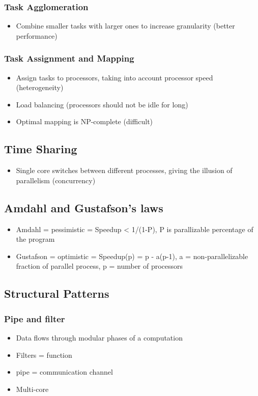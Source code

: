 \documentclass{assignments}
\begin{document}
\subsubsection*{Task Agglomeration}
\label{sec:org986ff91}
\begin{itemize}
\item Combine smaller tasks with larger ones to increase granularity (better performance)
\end{itemize}
\subsubsection*{Task Assignment and Mapping}
\label{sec:org9cd00b1}
\begin{itemize}
\item Assign tasks to processors, taking into account processor speed (heterogeneity)
\item Load balancing (processors should not be idle for long)
\item Optimal mapping is NP-complete (difficult)
\end{itemize}
\subsection*{Time Sharing}
\label{sec:org1c304f6}
\begin{itemize}
\item Single core switches between different processes, giving the illusion of
parallelism (concurrency)
\end{itemize}
\subsection*{Amdahl and Gustafson's laws}
\label{sec:orgf2c7f77}
\begin{itemize}
\item Amdahl = pessimistic = Speedup < 1/(1-P), P is parallizable percentage of the program
\item Gustafson = optimistic = Speedup(p) = p - a(p-1), a = non-parallelizable
fraction of parallel process, p = number of processors
\end{itemize}
\subsection*{Structural Patterns}
\label{sec:org179975d}
\subsubsection*{Pipe and filter}
\label{sec:orgc01a83f}
\begin{itemize}
\item Data flows through modular phases of a computation
\item Filters = function
\item pipe = communication channel
\item Multi-core
\end{itemize}
\end{document}
